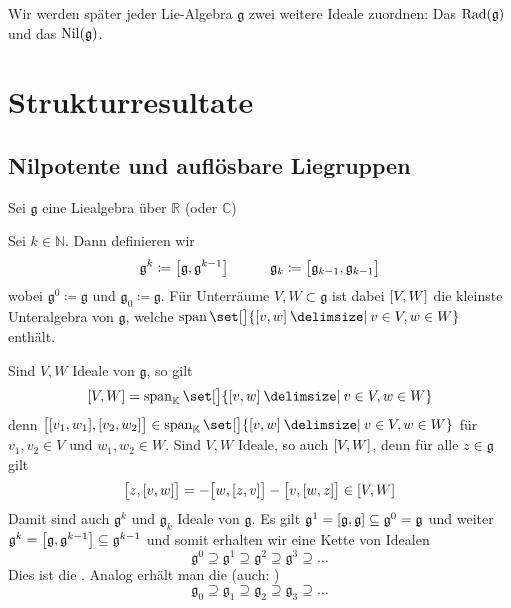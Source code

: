 Wir werden später jeder Lie-Algebra $\mathfrak{g}$ zwei weitere Ideale zuordnen: Das  $\Rad(\mathfrak{g})$ und das  $\Nil(\mathfrak{g})$.

\chapter{Strukturresultate} %
\label{cha:2}
\section{Nilpotente und auflösbare Liegruppen} %
\label{sec:21}
Sei $\mathfrak{g}$ eine Liealgebra über $\mathbb{R}$ (oder $\mathbb{C}$)

\begin{definition}[{name=[aufsteigende Zentralreihe und absteigende Reihe]}]
	Sei $k \in \mathbb{N}$.
	Dann definieren wir
	\[
		\mathfrak{g}^k \coloneqq \benbrace*{\mathfrak{g},\mathfrak{g}^{k-1}} \qquad \quad \mathfrak{g}_k \coloneqq \benbrace[\big]{\mathfrak{g}_{k-1},\mathfrak{g}_{k-1}}
	\] 
	wobei $\mathfrak{g}^0 \coloneqq \mathfrak{g}$ und $\mathfrak{g}_0 \coloneqq \mathfrak{g}$.
	Für Unterräume $V,W \subset \mathfrak{g}$ ist dabei $\benbrace*{V,W}$ die kleinste Unteralgebra von $\mathfrak{g}$, welche $\Span \set[\big]{\benbrace*{v,w} \given v \in V, w \in W}$ enthält.
\end{definition}

Sind $V,W$ Ideale von $\mathfrak{g}$, so gilt
\[
	\benbrace*{V,W} = \Span_\mathbb{K} \set[\big]{\benbrace*{v,w} \given v \in V, w \in W}
\]
denn $\benbrace[\big]{\benbrace*{v_1,w_1}, \benbrace*{v_2,w_2}} \in \Span_\mathbb{K} \set[\big]{\benbrace*{v,w} \given v \in V, w \in W}$ für $v_1,v_2 \in V$ und $w_1,w_2 \in W$.
Sind $V,W$ Ideale, so auch $\benbrace*{V,W}$, denn für alle $z \in \mathfrak{g}$ gilt
\begin{align}
	\benbrace[\big]{z, \benbrace*{v,w}} = - \benbrace[\big]{w, \benbrace*{z,v}} - \benbrace[\big]{v,\benbrace*{w,z}} \in \benbrace*{V,W}
\end{align}
Damit sind auch $\mathfrak{g}^k$ und $\mathfrak{g}_k$ Ideale von $\mathfrak{g}$. Es gilt $\mathfrak{g}^1= \benbrace*{\mathfrak{g}, \mathfrak{g}} \subseteq \mathfrak{g}^0 = \mathfrak{g}$ und weiter $\mathfrak{g}^k = \benbrace*{\mathfrak{g},\mathfrak{g}^{k-1}} \subseteq \mathfrak{g}^{k-1}$ und somit erhalten wir eine Kette von Idealen
\[
	\mathfrak{g}^0 \supseteq \mathfrak{g}^1 \supseteq \mathfrak{g}^2 \supseteq \mathfrak{g}^3 \supseteq \ldots 
\]
Dies ist die . Analog erhält man die  (auch: )
\[
	\mathfrak{g}_0 \supseteq \mathfrak{g}_1 \supseteq \mathfrak{g}_2 \supseteq \mathfrak{g}_3 \supseteq \ldots 
\]

